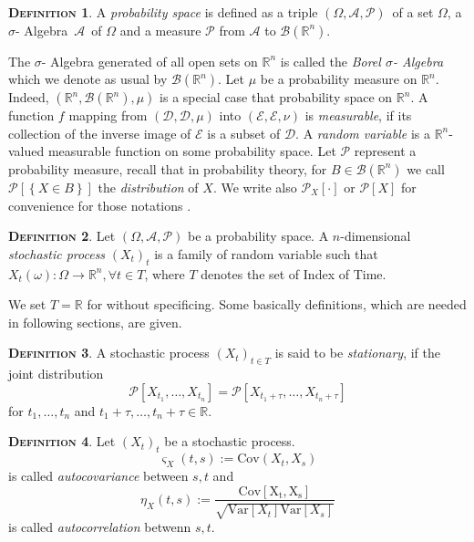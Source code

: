 \documentclass[a4paper, twoside, 11pt]{article}
\theoremstyle{definition}
\newtheorem{definition}{\scshape Definition}[section]
\def\AA{$\mathscr{A}$\ }
\def\sa{$\sigma$- Algebra\ }
\def\bs{$(\Omega, \mathscr{A}, \mathcal{P})$\ }
\def\bsigma{\mathscr{B}\brkt{\mathbb{R}^{n}}}
\newcommand{\sqbr}[1]{\left[ {#1} \right]}
\newcommand{\brkt}[1]{\left({#1} \right)}
\begin{document}
\begin{definition}
  A \emph{probability space} is defined as a triple \bs of a set $\Omega$, a \sa \AA  of $\Omega$ and a measure $\mathcal{P}$ from $\mathscr{A}$ to $\bsigma$.
\end{definition}

The $\sigma$- Algebra generated of all open sets on $\mathbb{R}^{n}$ is called the \emph{Borel $\sigma$- Algebra} which we denote as usual by $\mathscr{B}\left(\mathbb{R}^{n}\right)$. Let $\mu$ be a probability measure on $\mathbb{R}^{n}$. Indeed, $\brkt{\mathbb{R}^{n}, \mathscr{B}\brkt{\mathbb{R}^{n}}, \mu}$ is a special case that probability space on $\mathbb{R}^{n}$. A function $f$ mapping from $\brkt{\mathcal{D}, \mathscr{D}, \mu}$ into $\brkt{\mathcal{E}, \mathscr{E}, \nu}$ is \emph{measurable}, if its collection of the inverse image of $\mathscr{E}$ is a subset of $\mathscr{D}$. A \emph{random variable} is a $\mathbb{R}^{n}$-valued measurable function on some probability space. Let $\mathcal{P}$ represent a probability measure, recall that in probability theory, for $B \in \bsigma$ we call $\mathcal{P}\sqbr{\left\{X \in B\right\}}$ the \emph{distribution} of $X$. We write also $\mathcal{P}_X \sqbr{\cdot}$ or $\mathcal{P}\sqbr{X}$ for convenience for those notations .

\begin{definition}
  Let $\brkt{\Omega, \mathscr{A}, \mathcal{P}}$ be a probability space. A $n$-dimensional \emph{stochastic process} $\brkt{X_t}_{t}$ is a family of random variable such that $X_t\brkt{\omega} : \Omega \longrightarrow  \mathbb{R}^{n},  \forall t \in T$, where $T$ denotes the set of Index of Time.    
\end{definition}

We set $T=\mathbb{R}$ for without specificing. Some basically definitions, which are needed in following sections, are given.
\begin{definition}
  A stochastic process $\brkt{X_t}_{t \in T}$ is said to be \emph{stationary}, if the joint distribution 
\[
  \mathcal{P}\sqbr{X_{t_1},\dots,X_{t_n}} = \mathcal{P}\sqbr{X_{t_1+\tau},\dots,X_{t_n+\tau}} 
\]
for $t_1, \dots, t_n$ and $t_1+\tau,\dots,t_n+\tau \in \mathbb{R}$. 
\label{sec:stn}
\end{definition}


\begin{definition}
  Let $(X_t)_t$ be a stochastic process. 
  \begin{equation*}
	\varsigma_X(t,s) := \mathrm{Cov}(X_t, X_s) 
  \end{equation*} is called \emph{autocovariance} between $s, t$ and 
  \begin{equation*}
	\eta_X(t, s) := \frac{\mathrm{Cov[X_t, X_s]}}{\sqrt{\mathrm{Var}[X_t]\mathrm{Var}[X_s]}}
  \end{equation*}
  is called \emph{autocorrelation} betwenn $s, t$.
\end{definition}
\end{document}
